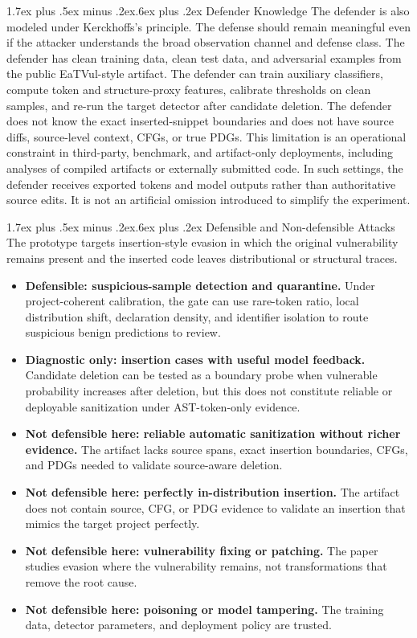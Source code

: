 \documentclass[letterpaper,twocolumn,10pt,twoside]{article}
\makeatletter
\renewcommand\subsection{\@startsection{subsection}{2}{\z@}%
  {1.7ex plus .5ex minus .2ex}{.6ex plus .2ex}%
  {\normalfont\normalsize\bfseries}}
\makeatother
\begin{document}
\subsection{Defender Knowledge}
The defender is also modeled under Kerckhoffs's principle. The defense should remain meaningful even if the attacker understands the broad observation channel and defense class. The defender has clean training data, clean test data, and adversarial examples from the public EaTVul-style artifact. The defender can train auxiliary classifiers, compute token and structure-proxy features, calibrate thresholds on clean samples, and re-run the target detector after candidate deletion. The defender does not know the exact inserted-snippet boundaries and does not have source diffs, source-level context, CFGs, or true PDGs. This limitation is an operational constraint in third-party, benchmark, and artifact-only deployments, including analyses of compiled artifacts or externally submitted code. In such settings, the defender receives exported tokens and model outputs rather than authoritative source edits. It is not an artificial omission introduced to simplify the experiment.

\subsection{Defensible and Non-defensible Attacks}
The prototype targets insertion-style evasion in which the original vulnerability remains present and the inserted code leaves distributional or structural traces.
\begin{itemize}
  \item \textbf{Defensible: suspicious-sample detection and quarantine.} Under project-coherent calibration, the gate can use rare-token ratio, local distribution shift, declaration density, and identifier isolation to route suspicious benign predictions to review.
  \item \textbf{Diagnostic only: insertion cases with useful model feedback.} Candidate deletion can be tested as a boundary probe when vulnerable probability increases after deletion, but this does not constitute reliable or deployable sanitization under AST-token-only evidence.
  \item \textbf{Not defensible here: reliable automatic sanitization without richer evidence.} The artifact lacks source spans, exact insertion boundaries, CFGs, and PDGs needed to validate source-aware deletion.
  \item \textbf{Not defensible here: perfectly in-distribution insertion.} The artifact does not contain source, CFG, or PDG evidence to validate an insertion that mimics the target project perfectly.
  \item \textbf{Not defensible here: vulnerability fixing or patching.} The paper studies evasion where the vulnerability remains, not transformations that remove the root cause.
  \item \textbf{Not defensible here: poisoning or model tampering.} The training data, detector parameters, and deployment policy are trusted.
\end{itemize}
\end{document}
